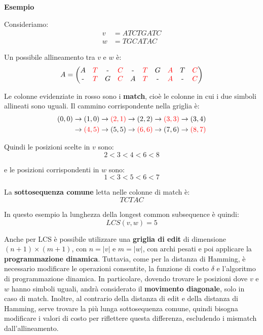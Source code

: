 \textbf{Esempio}

Consideriamo:
\begin{align*}
    v &= ATCTGATC \\
    w &= TGCATAC
\end{align*}

Un possibile allineamento tra $v$ e $w$ è:
\[
A =
\begin{pmatrix}
A & \textcolor{red}{T} & \text{-} & \textcolor{red}{C} & \text{-} & \textcolor{red}{T} & G & \textcolor{red}{A} & T & \textcolor{red}{C} \\
\text{-} & \textcolor{red}{T} & G & \textcolor{red}{C} & A & \textcolor{red}{T} & \text{-} & \textcolor{red}{A} & \text{-} & \textcolor{red}{C}
\end{pmatrix}
\]

Le colonne evidenziate in rosso sono i \textbf{match}, cioè le colonne in cui i due
simboli allineati sono uguali. Il cammino corrispondente nella griglia è:
\[
\begin{aligned}
(0,0) &\rightarrow (1,0) \rightarrow \textcolor{red}{(2,1)}
\rightarrow (2,2) \rightarrow \textcolor{red}{(3,3)} \rightarrow (3,4) \\
&\rightarrow \textcolor{red}{(4,5)} \rightarrow (5,5)
\rightarrow \textcolor{red}{(6,6)} \rightarrow (7,6)
\rightarrow \textcolor{red}{(8,7)}
\end{aligned}
\]

Quindi le posizioni scelte in $v$ sono:
\[
    2 < 3 < 4 < 6 < 8
\]

e le posizioni corrispondenti in $w$ sono:
\[
    1 < 3 < 5 < 6 < 7
\]

La \textbf{sottosequenza comune} letta nelle colonne di match è:
\[
    TCTAC
\]

In questo esempio la lunghezza della longest common subsequence è quindi:
\[
    LCS(v,w)=5
\]

Anche per LCS è possibile utilizzare una \textbf{griglia di edit} di dimensione $(n+1) \times (m+1)$, con $n = |v|$ e $m = |w|$, con archi pesati e poi applicare la \textbf{programmazione dinamica}.
Tuttavia, come per la distanza di Hamming, è necessario modificare le operazioni
consentite, la funzione di costo $\delta$ e l'algoritmo di programmazione dinamica.
In particolare, dovendo trovare le posizioni dove $v$ e $w$ hanno simboli uguali,
andrà considerato il \textbf{movimento diagonale}, solo in caso di match.
Inoltre, al contrario della distanza di edit e della distanza di Hamming, serve trovare la più lunga sottosequenza comune,
quindi bisogna modificare i valori di costo per riflettere questa differenza,
escludendo i mismatch dall'allineamento.


